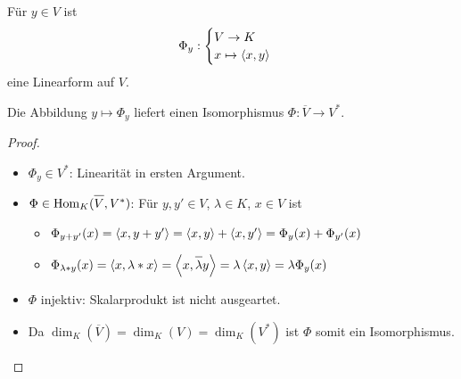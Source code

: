 \begin{lemma}
	Für $y\in V$ ist
	\begin{align}
		\Phi_y:
		\begin{cases}
			V\to K \\ x\mapsto\left\langle x,y\right\rangle
		\end{cases}\notag
	\end{align}
	eine Linearform auf $V$.
	
	Die Abbildung $y\mapsto\Phi_y$ liefert einen Isomorphismus $\Phi:\overline{V}\to V^*$.
\end{lemma}
\begin{proof}
	\begin{itemize}
		\item $\Phi_y\in V^*$: Linearität in ersten Argument.
		\item $\Phi\in \Hom_K(\overline{V},V^*)$: Für $y,y'\in V$, $\lambda\in K$, $x\in V$ ist
		\begin{itemize}
			\item $\Phi_{y+y'}(x)=\left\langle x,y+y'\right\rangle=\left\langle x,y\right\rangle+\left\langle x,y'\right\rangle=\Phi_y(x)+\Phi_{y'}(x)$
			\item $\Phi_{\lambda\ast y}(x)=\skalar{x}{\lambda\ast x}=\skalar{x}{\overline{\lambda}y}=\lambda \skalar{x}{y}=\lambda\Phi_y(x)$
		\end{itemize}
		\item $\Phi$ injektiv: Skalarprodukt ist nicht ausgeartet.
		\item Da $\dim_K(\overline{V})=\dim_K(V)=\dim_K(V^*)$ ist $\Phi$ somit ein Isomorphismus.
	\end{itemize}
\end{proof}

